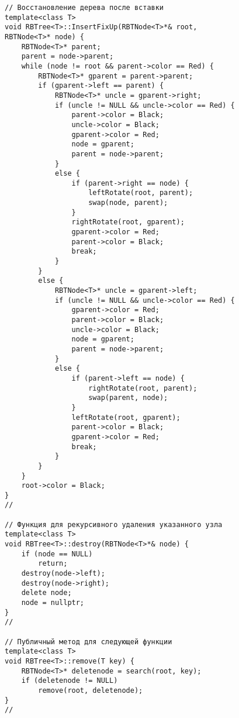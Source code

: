 \documentclass[bachelor, och, referat, times]{SCWorks}
\begin{document}
\begin{verbatim}
// Восстановление дерева после вставки
template<class T>
void RBTree<T>::InsertFixUp(RBTNode<T>*& root,
RBTNode<T>* node) {
    RBTNode<T>* parent;
    parent = node->parent;
    while (node != root && parent->color == Red) {
        RBTNode<T>* gparent = parent->parent;
        if (gparent->left == parent) {
            RBTNode<T>* uncle = gparent->right;
            if (uncle != NULL && uncle->color == Red) {
                parent->color = Black;
                uncle->color = Black;
                gparent->color = Red;
                node = gparent;
                parent = node->parent;
            }
            else {
                if (parent->right == node) {
                    leftRotate(root, parent);
                    swap(node, parent);
                }
                rightRotate(root, gparent);
                gparent->color = Red;
                parent->color = Black;
                break;
            }
        }
        else {
            RBTNode<T>* uncle = gparent->left;
            if (uncle != NULL && uncle->color == Red) {
                gparent->color = Red;
                parent->color = Black;
                uncle->color = Black;
                node = gparent;
                parent = node->parent;
            }
            else {
                if (parent->left == node) {
                    rightRotate(root, parent);
                    swap(parent, node);
                }
                leftRotate(root, gparent);
                parent->color = Black;
                gparent->color = Red;
                break;
            }
        }
    }
    root->color = Black;
}
//

// Функция для рекурсивного удаления указанного узла
template<class T>
void RBTree<T>::destroy(RBTNode<T>*& node) {
    if (node == NULL)
        return;
    destroy(node->left);
    destroy(node->right);
    delete node;
    node = nullptr;
}
//

// Публичный метод для следующей функции
template<class T>
void RBTree<T>::remove(T key) {
    RBTNode<T>* deletenode = search(root, key);
    if (deletenode != NULL)
        remove(root, deletenode);
}
//


\end{verbatim}
\end{document}
